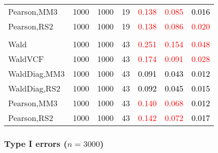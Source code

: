 \documentclass[
]{article}
\begin{document}
\begin{table}[H]
{\begin{tabular}[t]{lrrrrrr}
\hspace{1em}Pearson,MM3 & 1000 & 1000 & 19 & \textcolor{red}{0.138} & \textcolor{red}{0.085} & \textcolor{black}{0.016}\\
\hspace{1em}Pearson,RS2 & 1000 & 1000 & 19 & \textcolor{red}{0.138} & \textcolor{red}{0.086} & \textcolor{red}{0.020}\\
\addlinespace[0.3em]
\multicolumn{7}{l}{\textbf{3F 15V}}\\
\hspace{1em}Wald & 1000 & 1000 & 43 & \textcolor{red}{0.251} & \textcolor{red}{0.154} & \textcolor{red}{0.048}\\
\hspace{1em}WaldVCF & 1000 & 1000 & 43 & \textcolor{red}{0.174} & \textcolor{red}{0.091} & \textcolor{red}{0.028}\\
\hspace{1em}WaldDiag,MM3 & 1000 & 1000 & 43 & \textcolor{black}{0.091} & \textcolor{black}{0.043} & \textcolor{black}{0.012}\\
\hspace{1em}WaldDiag,RS2 & 1000 & 1000 & 43 & \textcolor{black}{0.092} & \textcolor{black}{0.045} & \textcolor{black}{0.015}\\
\hspace{1em}Pearson,MM3 & 1000 & 1000 & 43 & \textcolor{red}{0.140} & \textcolor{red}{0.068} & \textcolor{black}{0.012}\\
\hspace{1em}Pearson,RS2 & 1000 & 1000 & 43 & \textcolor{red}{0.142} & \textcolor{red}{0.072} & \textcolor{black}{0.017}\\
\bottomrule
\end{tabular}}
\endgroup{}
\end{table}

\hypertarget{type-i-errors-n3000-3}{%
\subsubsection{\texorpdfstring{Type I errors
(\(n=3000\))}{Type I errors (n=3000)}}\label{type-i-errors-n3000-3}}
\end{document}

